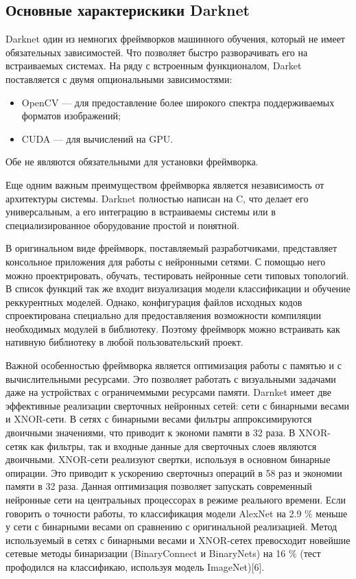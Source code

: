 \documentclass[a4paper,english,russian]{G2-105}
\begin{document}
\subsection{Основные характерискики Darknet}
\par Darknet один из немногих фреймворков машинного обучения, который не имеет обязательных зависимостей. Что позволяет быстро разворачивать его на встраиваемых системах. На ряду с встроенным функционалом, Darket поставляется с двумя опциональными зависимостями:
\begin{itemize}
\item OpenCV --- для предоставление более широкого спектра поддерживаемых форматов изображений;
\item CUDA --- для вычислений на GPU. 
\end{itemize}
\par Обе не являются обязательными для установки фреймворка.
\par Еще одним важным преимуществом фреймворка является независимость от архитектуры системы. Darknet полностью написан на C, что делает его универсальным, а его интеграцию в встраиваемы системы или в специализированное оборудование простой и понятной. 
\par В оригинальном виде фреймворк, поставляемый разработчиками, представляет консольное приложения для работы с нейронными сетями. С помощью него можно проектрировать, обучать, тестировать нейронные сети типовых топологий. В список функций так же входит визуализация модели классификации и обучение реккурентных моделей. Однако, конфигурация файлов исходных кодов спроектирована специально для предоставляения возможности компиляции необходимых модулей в библиотеку. Поэтому фреймворк можно встраивать как нативную библиотеку в любой пользовательский проект.
\par Важной особенностью фреймворка является оптимизация работы с памятью и с вычислительными ресурсами. Это позволяет работать с визуальными задачами даже на устройствах с ограничеммыми ресурсами памяти. Darnket имеет две эффективные реализации сверточных нейронных сетей: сети с бинарными весами и XNOR-сети. В сетях с бинарными весами фильтры аппроксимируются двоичными значениями, что приводит к экономи памяти в 32 раза. В XNOR-сетяк как фильтры, так и входные данные для сверточных слоев являются двоичными. XNOR-сети реализуют свертки, используя в основном бинарные опирации. Это приводит к ускорению сверточныз операций в 58 раз и экономии памяти в 32 раза. Данная оптимизация позволяет запускать современный нейронные сети на центральных процессорах в режиме реального времени. Если говорить о точности работы, то классификация модели AlexNet на 2.9 \% меньше у сети с бинарными весами оп сравнению с оригинальной реализацией. Метод используемый в сетях с бинарными весами и XNOR-сетех превосходит новейшие сетевые методы бинаризации (BinaryConnect и BinaryNets) на 16 \% (тест профодился на классификаю, используя модель ImageNet)[6].
\end{document}
